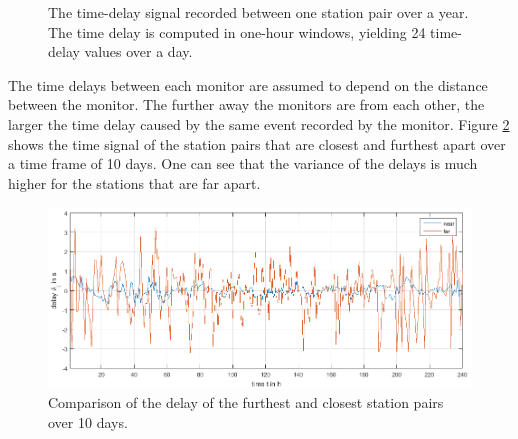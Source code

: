 \documentclass[12pt,a4paper,english]{article}
\begin{document}
\begin{figure}[ht] 
  \centering 
{}
\caption{The time-delay signal recorded between one station pair over a year. The time delay is computed in one-hour windows, yielding 24 time-delay values over a day.}
\label{fig:examplesignal}
\end{figure}

The time delays between each monitor are assumed to depend on the distance between the monitor. The further away the monitors are from each other, the larger the time delay caused by the same event recorded by the monitor. Figure \ref{fig:nearfar} shows the time signal of the station pairs that are closest and furthest apart over a time frame of 10 days. One can see that the variance of the delays is much higher for the stations that are far apart. 
\begin{figure}[ht]
  \begin{center}   
   \includegraphics[width=\textwidth]{Comparisondelayoverrandomdayoffarestandclosestlinks.png}
  \end{center}
  \caption{Comparison of the delay of the furthest and closest station pairs over 10 days.}\label{fig:nearfar}
\end{figure}
\end{document}
